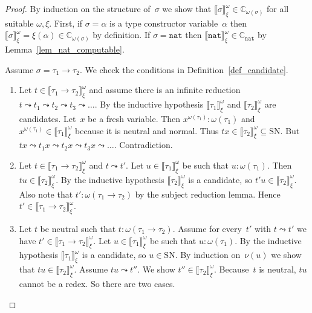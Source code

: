 \documentclass[runningheads,a4paper]{llncs}
\newcommand{\arrtype}{\rightarrow}
\newcommand{\nat}{\mathtt{nat}}
\newcommand{\SN}{\mathrm{SN}}
\newcommand{\Cb}{\mathbb{C}}
\newcommand{\val}[3]{\ensuremath{\llbracket#1\rrbracket_{#2}^{#3}}}
\begin{document}
\begin{proof}
  By induction on the structure of~$\sigma$ we show that
  $\val{\sigma}{\xi}{\omega} \in \Cb_{\omega(\sigma)}$ for all
  suitable $\omega,\xi$. First, if $\sigma = \alpha$ is a type
  constructor variable~$\alpha$ then $\val{\sigma}{\xi}{\omega} =
  \xi(\alpha) \in \Cb_{\omega(\sigma)}$ by definition. If $\sigma =
  \nat$ then $\val{\nat}{\xi}{\omega} \in \Cb_{\nat}$ by
  Lemma~\ref{lem_nat_computable}.

  Assume $\sigma = \tau_1 \arrtype \tau_2$. We check the conditions in
  Definition~\ref{def_candidate}.
  \begin{enumerate}
  \item Let $t \in \val{\tau_1\arrtype\tau_2}{\xi}{\omega}$ and assume
    there is an infinite reduction $t \leadsto t_1 \leadsto t_2
    \leadsto t_3 \leadsto \ldots$. By the inductive hypothesis
    $\val{\tau_1}{\xi}{\omega}$ and $\val{\tau_2}{\xi}{\omega}$ are
    candidates. Let~$x$ be a fresh variable. Then $x^{\omega(\tau_1)}
    : \omega(\tau_1)$ and $x^{\omega(\tau_1)} \in
    \val{\tau_1}{\xi}{\omega}$ because it is neutral and normal. Thus
    $t x \in \val{\tau_2}{\xi}{\omega} \subseteq \SN$. But $t x
    \leadsto t_1 x \leadsto t_2 x \leadsto t_3 x \leadsto
    \ldots$. Contradiction.
  \item Let $t \in \val{\tau_1\arrtype\tau_2}{\xi}{\omega}$ and $t
    \leadsto t'$. Let $u \in \val{\tau_1}{\xi}{\omega}$ be such that
    $u : \omega(\tau_1)$. Then $t u \in \val{\tau_2}{\xi}{\omega}$. By
    the inductive hypothesis $\val{\tau_2}{\xi}{\omega}$ is a
    candidate, so $t' u \in \val{\tau_2}{\xi}{\omega}$. Also note that
    $t' : \omega(\tau_1 \arrtype \tau_2)$ by the subject reduction
    lemma. Hence $t' \in \val{\tau_1\arrtype\tau_2}{\xi}{\omega}$.
  \item Let $t$ be neutral such that $t : \omega(\tau_1 \arrtype
    \tau_2)$. Assume for every~$t'$ with $t \leadsto t'$ we have $t'
    \in \val{\tau_1\arrtype\tau_2}{\xi}{\omega}$. Let $u \in
    \val{\tau_1}{\xi}{\omega}$ be such that $u : \omega(\tau_1)$. By
    the inductive hypothesis $\val{\tau_1}{\xi}{\omega}$ is a
    candidate, so $u \in \SN$. By induction on~$\nu(u)$ we show that
    $t u \in \val{\tau_2}{\xi}{\omega}$. Assume $t u \leadsto t''$. We
    show $t'' \in \val{\tau_2}{\xi}{\omega}$. Because~$t$ is neutral,
    $t u$ cannot be a redex. So there are two cases.
\end{enumerate}
\end{proof}
\end{document}
